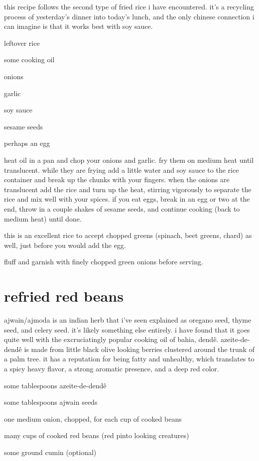 this recipe follows the second type of fried rice i have
encountered. it's a recycling process of yesterday's dinner into
today's lunch, and the only chinese connection i can imagine is
that it works best with soy sauce.

\begin{ingredients}
  \item leftover rice
  \item some cooking oil
  \item onions
  \item garlic
  \item soy sauce
  \item sesame seeds
  \item perhaps an egg
\end{ingredients}

heat oil in a pan and chop your onions and garlic. fry them on medium
heat until translucent. while they are frying add a little water and
soy sauce to the rice container and break up the chunks with your
fingers. when the onions are translucent add the rice and turn up the
heat, stirring vigorously to separate the rice and mix well with your
spices. if you eat eggs, break in an egg or two at the end, throw in a
couple shakes of sesame seeds, and continue cooking (back to medium
heat) until done.

this is an excellent rice to accept chopped greens (spinach, beet
greens, chard) as well, just before you would add the egg.

fluff and garnish with finely chopped green onions before serving.

\section{refried red beans}

ajwain/ajmoda is an indian herb that i've seen explained as oregano
seed, thyme seed, and celery seed. it's likely something else
entirely. i have found that it goes quite well with the excruciatingly
popular cooking oil of bahia, dend\^{e}. azeite-de-dend\^{e} is made
from little black olive looking berries clustered around the trunk of
a palm tree. it has a reputation for being fatty and unhealthy, which
translates to a spicy heavy flavor, a strong aromatic presence, and a
deep red color.

\begin{ingredients}
  \item some tablespoons azeite-de-dend\^{e}
  \item some tablespoons ajwain seeds
  \item one medium onion, chopped, for each cup of cooked beans
  \item many cups of cooked red beans (red pinto looking creatures)
  \item some ground cumin (optional)
\end{ingredients}

